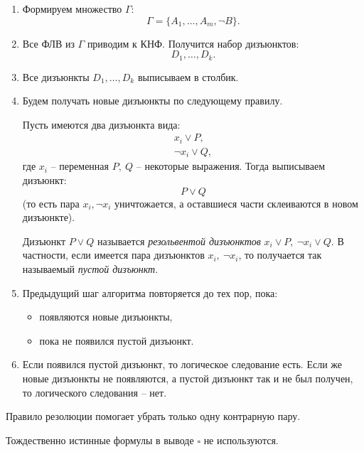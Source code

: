 \begin{remark}\leavevmode
    \begin{enumerate}
        \item Формируем множество $ \Gamma $:
              \[
                  \Gamma = \{A_1,\ldots,A_m, \lnot B\}.
              \]
        \item Все ФЛВ из $ \Gamma $ приводим к КНФ. Получится набор дизъюнктов:
              \[
                  D_1,\ldots,D_k.
              \]
        \item Все дизъюнкты $ D_1,\ldots,D_k $ выписываем в столбик.
        \item Будем получать новые дизъюнкты по следующему правилу.

              Пусть имеются два дизъюнкта вида:
              \[
                  \begin{array}{l}
                      x_i \lor P, \\
                      \lnot x_i \lor Q,
                  \end{array}
              \]
              где $ x_i $ -- переменная $ P, \ Q $ -- некоторые выражения. Тогда выписываем дизъюнкт:
              \[
                  P \lor Q
              \]
              (то есть пара $ x_i,\lnot x_i $ уничтожается, а оставшиеся части склеиваются в новом дизъюнкте).

              Дизъюнкт $ P \lor Q $ называется \emph{резольвентой дизъюнктов} $ x_i \lor P, \ \lnot x_i \lor Q $. В частности, если имеется пара дизъюнктов $ x_i, \ \lnot x_i $, то получается так называемый \emph{пустой дизъюнкт}.

        \item Предыдущий шаг алгоритма повторяется до тех пор, пока:
              \begin{itemize}
                  \item появляются новые дизъюнкты,
                  \item пока не появился пустой дизъюнкт.
              \end{itemize}

        \item Если появился пустой дизъюнкт, то логическое следование есть. Если же новые дизъюнкты не появляются, а пустой дизъюнкт так и не был получен, то логического следования -- нет.
    \end{enumerate}
\end{remark}

\begin{remark}
    Правило резолюции помогает убрать только одну контрарную пару.
\end{remark}

\begin{remark}
    Тождественно истинные формулы в выводе $ \square $ не используются.
\end{remark}

\newpage